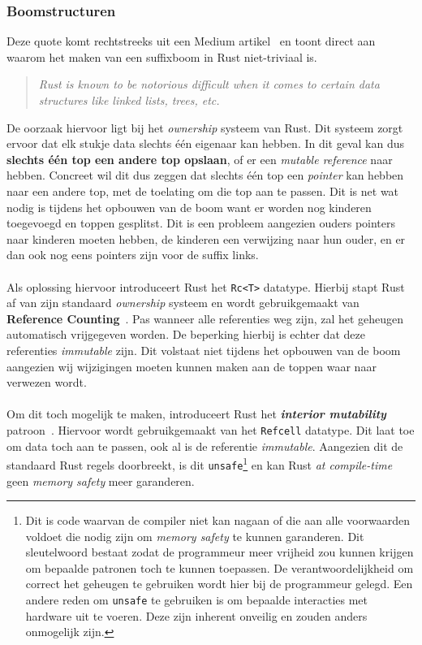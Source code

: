 \subsubsection{Boomstructuren}
Deze quote komt rechtstreeks uit een Medium artikel~\cite{rust_difficulty_quote} en toont direct aan waarom het maken van een suffixboom in Rust niet-triviaal is.
\begin{quote}
    \textit{Rust is known to be notorious difficult when it comes to certain data structures like linked lists, trees, etc.}
\end{quote}
De oorzaak hiervoor ligt bij het \textit{ownership} systeem van Rust.
Dit systeem zorgt ervoor dat elk stukje data slechts één eigenaar kan hebben.
In dit geval kan dus \textbf{slechts één top een andere top opslaan}, of er een \textit{mutable reference} naar hebben.
Concreet wil dit dus zeggen dat slechts één top een \textit{pointer} kan hebben naar een andere top, met de toelating om die top aan te passen.
Dit is net wat nodig is tijdens het opbouwen van de boom want er worden nog kinderen toegevoegd en toppen gesplitst.
Dit is een probleem aangezien ouders pointers naar kinderen moeten hebben, de kinderen een verwijzing naar hun ouder, en er dan ook nog eens pointers zijn voor de suffix links.
\\ \\
Als oplossing hiervoor introduceert Rust het \texttt{Rc<T>} datatype.
Hierbij stapt Rust af van zijn standaard \textit{ownership} systeem en wordt gebruikgemaakt van \textbf{Reference Counting}~\cite{reference_counting}.
Pas wanneer alle referenties weg zijn, zal het geheugen automatisch vrijgegeven worden.
De beperking hierbij is echter dat deze referenties \textit{immutable} zijn.
Dit volstaat niet tijdens het opbouwen van de boom aangezien wij wijzigingen moeten kunnen maken aan de toppen waar naar verwezen wordt.
\\ \\
Om dit toch mogelijk te maken, introduceert Rust het \textbf{\textit{interior mutability}} patroon~\cite{interior_mutability}.
Hiervoor wordt gebruikgemaakt van het \texttt{Refcell} datatype.
Dit laat toe om data toch aan te passen, ook al is de referentie \textit{immutable}.
Aangezien dit de standaard Rust regels doorbreekt, is dit \texttt{unsafe}\footnote{Dit is code waarvan de compiler niet kan nagaan of die aan alle voorwaarden voldoet die nodig zijn om \textit{memory safety} te kunnen garanderen. Dit sleutelwoord bestaat zodat de programmeur meer vrijheid zou kunnen krijgen om bepaalde patronen toch te kunnen toepassen. De verantwoordelijkheid om correct het geheugen te gebruiken wordt hier bij de programmeur gelegd. Een andere reden om \texttt{unsafe} te gebruiken is om bepaalde interacties met hardware uit te voeren. Deze zijn inherent onveilig en zouden anders onmogelijk zijn.} en kan Rust \textit{at compile-time} geen \textit{memory safety} meer garanderen.
